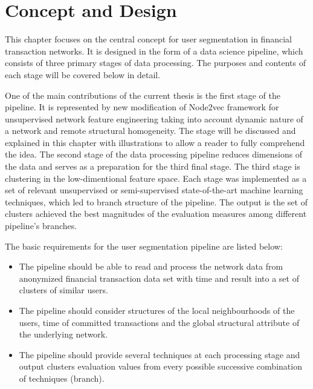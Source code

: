 \chapter{Concept and Design}
\label{cha:conceptanddesign}

This chapter focuses on the central concept for user segmentation in financial transaction networks. It is designed in the form of a data science pipeline, which consists of three primary stages of data processing. The purposes and contents of each stage will be covered below in detail. 

One of the main contributions of the current thesis is the first stage of the pipeline. It is represented by new modification of Node2vec framework for unsupervised network feature engineering taking into account dynamic nature of a network and remote structural homogeneity. The stage will be discussed and explained in this chapter with illustrations to allow a reader to fully comprehend the idea. The second stage of the data processing pipeline reduces dimensions of the data and serves as a preparation for the third final stage. The third stage is clustering in the low-dimentional feature space. Each stage was implemented as a set of relevant unsupervised or semi-supervised state-of-the-art machine learning techniques, which led to branch structure of the pipeline. The output is the set of clusters achieved the best magnitudes of the evaluation measures among different pipeline's branches.

The basic requirements for the user segmentation pipeline are listed below:
\begin{itemize}
  \item The pipeline should be able to read and process the network data from anonymized financial transaction data set with time and result into a set of clusters of similar users. 
  \item The pipeline should consider structures of the local neighbourhoods of the users, time of committed transactions and the global structural attribute of the underlying network.
  \item The pipeline should provide several techniques at each processing stage and output clusters evaluation values from every possible successive combination of techniques (branch).
\end{itemize}

